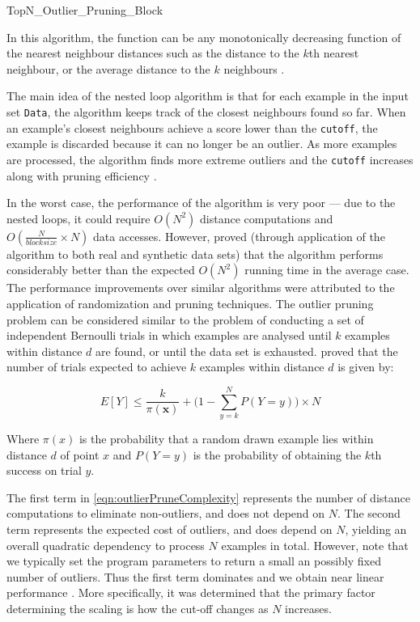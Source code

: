 \begin{algorithm}
    
    \caption{TopN\_Outlier\_Pruning\_Block}
    \label{algm:TopNOutlierPruningBlock}
\end{algorithm}

In this algorithm, the  function can be any monotonically
decreasing function of the nearest neighbour distances such as the distance to
the $k$th nearest neighbour, or the average distance to the $k$ neighbours
\cite{Bay:2003}.

The main idea of the nested loop algorithm is that for each example in the
input set \verb+Data+, the algorithm keeps track of the closest neighbours found
so far. When an example's closest neighbours achieve a score lower than the
\verb+cutoff+, the example is discarded because it can no longer be an outlier.
As more examples are processed, the algorithm finds more extreme outliers and
the \verb+cutoff+ increases along with pruning efficiency \cite{Bay:2003}.

In the worst case, the performance of the algorithm is very poor --- due to the
nested loops, it could require $O(N^{2})$ distance computations and
$O(\frac{N}{blocksize} \times N)$ data accesses. However, \citeauthor{Bay:2003}
proved (through application of the algorithm to both real and synthetic data
sets) that the algorithm performs considerably better than the expected
$O(N^{2})$ running time in the average case. The performance improvements over
similar algorithms were attributed to the application of randomization and
pruning techniques. The outlier pruning problem can be considered similar to the
problem of conducting a set of independent Bernoulli trials in which examples
are analysed until $k$ examples within distance $d$ are found, or until the data
set is exhausted. \citeauthor{Bay:2003} proved that the number of trials
expected to achieve $k$ examples within distance $d$ is given by:

\begin{equation}
\label{eqn:outlierPruneComplexity}
E[Y] \leq \frac{k}{\pi(\textbf{x})} + \Bigg(1 - \sum_{y=k}^{N} P(Y=y)\Bigg) \times N
\end{equation}

Where $\pi(x)$ is the probability that a random drawn example lies within
distance $d$ of point $x$ and $P(Y=y)$ is the probability of obtaining the $k$th
success on trial $y$.

The first term in \autoref{eqn:outlierPruneComplexity} represents the number of
distance computations to eliminate non-outliers, and does not depend on $N$. The
second term represents the expected cost of outliers, and does depend on $N$,
yielding an overall quadratic dependency to process $N$ examples in total.
However, note that we typically set the program parameters to return a small an
possibly fixed number of outliers. Thus the first term dominates and we obtain
near linear performance \cite{Bay:2003}. More specifically, it was determined
that the primary factor determining the scaling is how the cut-off changes as
$N$ increases.

